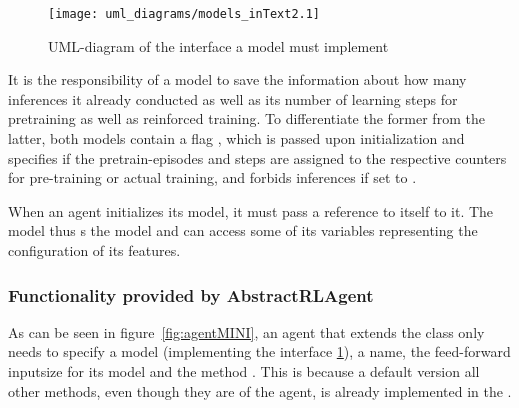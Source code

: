 \begin{figure}[h!]
	\centering 
	\texttt{[image: uml\_diagrams/models\_inText2.1]}
	\caption{UML-diagram of the interface a model must implement}
	\label{fig:modelsInt}
\end{figure}

It is the responsibility of a model to save the information about how many inferences it already conducted as well as its number of learning steps for pretraining as well as reinforced training. To differentiate the former from the latter, both models contain a flag , which is passed upon initialization and specifies if the pretrain-episodes and steps are assigned to the respective counters for pre-training or actual training, and forbids inferences if set to .

When an agent initializes its model, it must pass a reference to itself to it. The model thus s the model and can access some of its variables representing the configuration of its features.


\subsubsection{Functionality provided by AbstractRLAgent}

As can be seen in figure~\ref{fig:agentMINI}, an agent that extends the class  only needs to specify a model (implementing the interface \ref{fig:modelsInt}), a name, the feed-forward inputsize for its model and the method . This is because a default version all other methods, even though they are  of the agent, is already implemented in the . 

